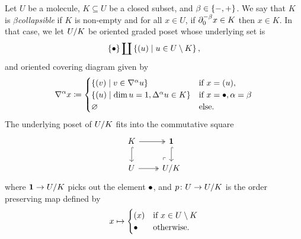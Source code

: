\begin{dfn}  \label{dfn:collapsible}
    Let \( U \) be a molecule, \( K \subseteq U \) be a closed subset, and \( \beta \in \set{-, +} \).
    We say that \( K \) is \emph{\( \beta \)\nbd collapsible} if \( K \) is non-empty and for all \( x \in U \), if \( \bd{0}{-\beta} x \in K \) then \( x \in K \).
    In that case, we let \( \coll K U \) be oriented graded poset whose underlying set is
    \begin{equation*}
        \set{\zcoll} \coprod \set{\icoll u \mid u \in U \setminus K},
    \end{equation*}
    and oriented covering diagram given by
    \begin{equation*}
        \cofaces{}{\a} x \eqdef
        \begin{cases}
            \set{ \icoll v \mid v \in \cofaces{}{\a} u} & \text{if } x = \icoll u,\\
            \set{ \icoll u \mid \dim u = 1, \faces{}{\a} u \in K} &\text{if } x = \bullet, \a = \beta\\
            \varnothing &\text{else.}
        \end{cases}
    \end{equation*}
    The underlying poset of \( \coll{K}{U} \) fits into the commutative square
    \begin{equation} \label{tik:square_collapse}
        \begin{tikzcd} 
            K & \pt \\
            U & {\coll K U}
            \arrow[""{name=0, anchor=center, inner sep=0}, two heads, from=1-1, to=1-2]
            \arrow[hook, from=1-1, to=2-1]
            \arrow[hook, from=1-2, to=2-2]
            \arrow[two heads, from=2-1, to=2-2]
            \arrow["\lrcorner"{anchor=center, pos=0.125, rotate=180}, draw=none, from=2-2, to=0]
        \end{tikzcd}
    \end{equation}
    where \( \pt \to \coll{K}{U} \) picks out the element \( \zcoll \), and \( \mapcoll \colon U \to \coll{K}{U} \) is the order preserving map defined by
    \begin{equation*}
        x \mapsto
        \begin{cases}
            \icoll x & \text{if } x \in U \setminus K\\
            \zcoll & \text{otherwise.}
        \end{cases}
    \end{equation*}
\end{dfn}

